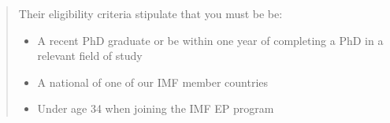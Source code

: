 \documentclass{\classes/econtex}
\begin{document}
\begin{enumerate}
\begin{quote}
	Their eligibility criteria stipulate that you must be be:
	\begin{itemize}
		\item A recent PhD graduate or be within one year of completing a PhD in a relevant field of study
		\item A national of one of our IMF member countries
		\item Under age 34 when joining the IMF EP program
	\end{itemize}
	
\end{quote}
\end{enumerate}
\end{document}
